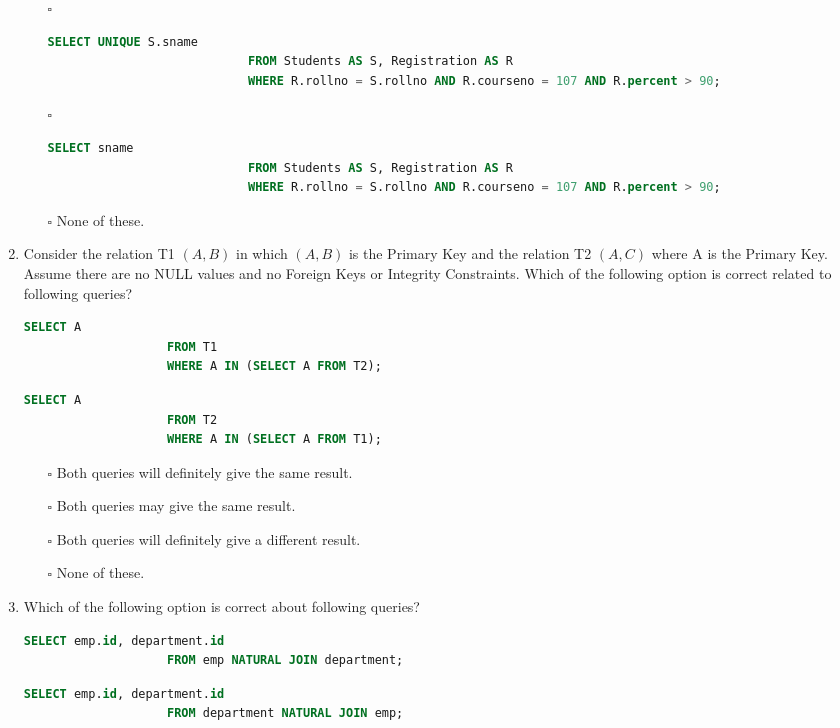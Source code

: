 \documentclass[10pt]{article}
\begin{document}
\begin{enumerate}
\begin{enumerate}
					\item[$\square$] 
						\begin{lstlisting}[language=SQL,firstline=1, lastline=3, numbers = right] 
							SELECT UNIQUE S.sname 
							FROM Students AS S, Registration AS R 
							WHERE R.rollno = S.rollno AND R.courseno = 107 AND R.percent > 90;
						\end{lstlisting}
					
					\item[$\square$] 
						\begin{lstlisting}[language=SQL,firstline=1, lastline=3, numbers = right] 
							SELECT sname 
							FROM Students AS S, Registration AS R 
							WHERE R.rollno = S.rollno AND R.courseno = 107 AND R.percent > 90;
						\end{lstlisting}
					
					\item[$\square$] None of these.
				\end{enumerate}

			\item Consider the relation T1 $(A,B)$ in which $(A,B)$ is the Primary Key and the relation T2 $(A,C)$ where A is the Primary Key. Assume there are no NULL values and no Foreign Keys or Integrity Constraints. Which of the following option is correct related to following queries?
				\begin{lstlisting}[language=SQL,firstline=1, lastline=3] 
					SELECT A 
					FROM T1 
					WHERE A IN (SELECT A FROM T2);
				\end{lstlisting}
				\begin{lstlisting}[language=SQL,firstline=1, lastline=3] 
					SELECT A 
					FROM T2 
					WHERE A IN (SELECT A FROM T1);
				\end{lstlisting}

				\begin{enumerate}
					\item[$\square$] Both queries will definitely give the same result.
					\item[$\square$] Both queries may give the same result.
					\item[$\square$] Both queries will definitely give a different result.
					\item[$\square$] None of these.
				\end{enumerate}

			\item Which of the following option is correct about following queries?
				\begin{lstlisting}[language=SQL,firstline=1, lastline=2] 
					SELECT emp.id, department.id 
					FROM emp NATURAL JOIN department;
				\end{lstlisting}
				\begin{lstlisting}[language=SQL,firstline=1, lastline=2] 
					SELECT emp.id, department.id 
					FROM department NATURAL JOIN emp;
				\end{lstlisting}


\end{enumerate}
\end{document}
